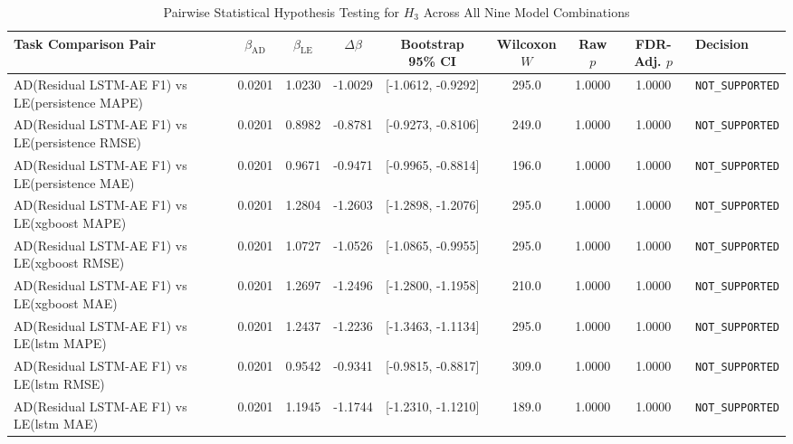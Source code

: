 \begin{table}[htbp]
\centering
\caption{Pairwise Statistical Hypothesis Testing for $H_3$ Across All Nine Model Combinations}
\label{tab:h3_statistics}
\begin{tabular}{lcccccccl}
\hline
\textbf{Task Comparison Pair} & $\beta_{\text{AD}}$ & $\beta_{\text{LE}}$ & $\Delta\beta$ & \textbf{Bootstrap 95\% CI} & \textbf{Wilcoxon $W$} & \textbf{Raw $p$} & \textbf{FDR-Adj. $p$} & \textbf{Decision} \\
\hline
AD(Residual LSTM-AE F1) vs LE(persistence MAPE) & 0.0201 & 1.0230 & -1.0029 & [-1.0612, -0.9292] & 295.0 & 1.0000 & 1.0000 & \texttt{NOT_SUPPORTED} \\
AD(Residual LSTM-AE F1) vs LE(persistence RMSE) & 0.0201 & 0.8982 & -0.8781 & [-0.9273, -0.8106] & 249.0 & 1.0000 & 1.0000 & \texttt{NOT_SUPPORTED} \\
AD(Residual LSTM-AE F1) vs LE(persistence MAE) & 0.0201 & 0.9671 & -0.9471 & [-0.9965, -0.8814] & 196.0 & 1.0000 & 1.0000 & \texttt{NOT_SUPPORTED} \\
AD(Residual LSTM-AE F1) vs LE(xgboost MAPE) & 0.0201 & 1.2804 & -1.2603 & [-1.2898, -1.2076] & 295.0 & 1.0000 & 1.0000 & \texttt{NOT_SUPPORTED} \\
AD(Residual LSTM-AE F1) vs LE(xgboost RMSE) & 0.0201 & 1.0727 & -1.0526 & [-1.0865, -0.9955] & 295.0 & 1.0000 & 1.0000 & \texttt{NOT_SUPPORTED} \\
AD(Residual LSTM-AE F1) vs LE(xgboost MAE) & 0.0201 & 1.2697 & -1.2496 & [-1.2800, -1.1958] & 210.0 & 1.0000 & 1.0000 & \texttt{NOT_SUPPORTED} \\
AD(Residual LSTM-AE F1) vs LE(lstm MAPE) & 0.0201 & 1.2437 & -1.2236 & [-1.3463, -1.1134] & 295.0 & 1.0000 & 1.0000 & \texttt{NOT_SUPPORTED} \\
AD(Residual LSTM-AE F1) vs LE(lstm RMSE) & 0.0201 & 0.9542 & -0.9341 & [-0.9815, -0.8817] & 309.0 & 1.0000 & 1.0000 & \texttt{NOT_SUPPORTED} \\
AD(Residual LSTM-AE F1) vs LE(lstm MAE) & 0.0201 & 1.1945 & -1.1744 & [-1.2310, -1.1210] & 189.0 & 1.0000 & 1.0000 & \texttt{NOT_SUPPORTED} \\
\hline
\end{tabular}
\end{table}
